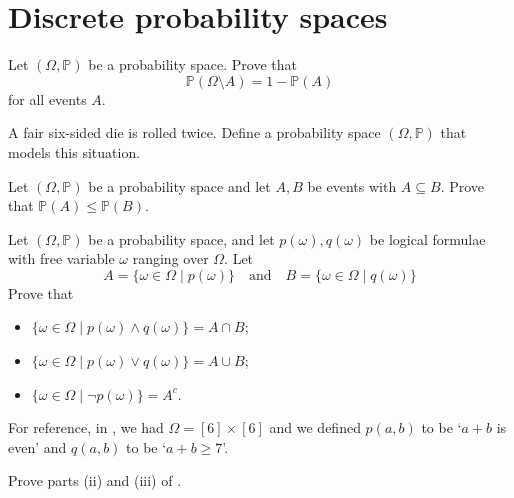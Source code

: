 \section{Discrete probability spaces}



\begin{exercise}
Let $(\Omega,\mathbb{P})$ be a probability space. Prove that
\[ \mathbb{P}(\Omega \setminus A) = 1-\mathbb{P}(A) \]
for all events $A$.
\end{exercise}



\begin{exercise}
A fair six-sided die is rolled twice. Define a probability space $(\Omega, \mathbb{P})$ that models this situation.
\end{exercise}

\begin{exercise}
\label{exProbabilityOfSubset}
Let $(\Omega,\mathbb{P})$ be a probability space and let $A,B$ be events with $A \subseteq B$. Prove that $\mathbb{P}(A) \le \mathbb{P}(B)$.
\end{exercise}


\begin{exercise}
\label{exFormalOrAndNot}
Let $(\Omega, \mathbb{P})$ be a probability space, and let $p(\omega),q(\omega)$ be logical formulae with free variable $\omega$ ranging over $\Omega$. Let
\[ A = \{ \omega \in \Omega \mid p(\omega) \} \quad \text{and} \quad B = \{ \omega \in \Omega \mid q(\omega) \} \]
Prove that
\begin{itemize}
\item $\{ \omega \in \Omega \mid p(\omega) \wedge q(\omega) \} = A \cap B$;
\item $\{ \omega \in \Omega \mid p(\omega) \vee q(\omega) \} = A \cup B$;
\item $\{ \omega \in \Omega \mid \neg p(\omega) \} = A^c$.
\end{itemize}
For reference, in , we had $\Omega = [6] \times [6]$ and we defined $p(a,b)$ to be `$a+b$ is even' and $q(a,b)$ to be `$a+b \ge 7$'.
\end{exercise}



\begin{exercise}
Prove parts (ii) and (iii) of .
\end{exercise}

